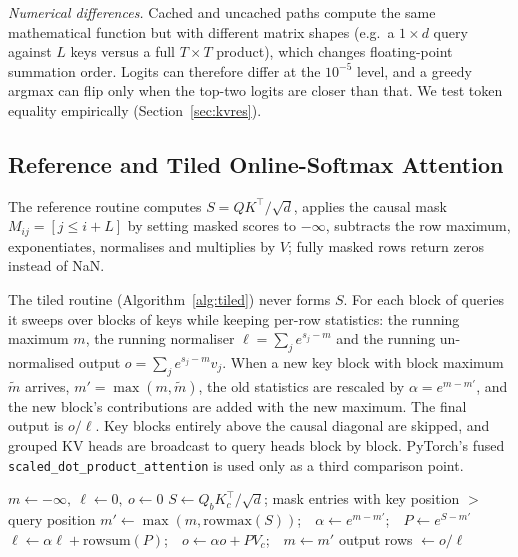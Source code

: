 \emph{Numerical differences.} Cached and uncached paths compute the same mathematical function but with different matrix shapes (e.g.\ a $1\times d$ query against $L$ keys versus a full $T\times T$ product), which changes floating-point summation order. Logits can therefore differ at the $10^{-5}$ level, and a greedy argmax can flip only when the top-two logits are closer than that. We test token equality empirically (Section~\ref{sec:kvres}).

\subsection{Reference and Tiled Online-Softmax Attention}
\label{sec:attn}
The reference routine computes $S=QK^\top/\sqrt d$, applies the causal mask $M_{ij}=[j\le i+L]$ by setting masked scores to $-\infty$, subtracts the row maximum, exponentiates, normalises and multiplies by $V$; fully masked rows return zeros instead of NaN.

The tiled routine (Algorithm~\ref{alg:tiled}) never forms $S$. For each block of queries it sweeps over blocks of keys while keeping per-row statistics: the running maximum $m$, the running normaliser $\ell=\sum_j e^{s_j-m}$ and the running un-normalised output $o=\sum_j e^{s_j-m}v_j$. When a new key block with block maximum $\tilde m$ arrives, $m'=\max(m,\tilde m)$, the old statistics are rescaled by $\alpha=e^{m-m'}$, and the new block's contributions are added with the new maximum. The final output is $o/\ell$. Key blocks entirely above the causal diagonal are skipped, and grouped KV heads are broadcast to query heads block by block. PyTorch's fused \texttt{scaled\_dot\_product\_attention} is used only as a third comparison point.

\begin{algorithm}[t]\caption{Tiled attention with online softmax (one head)}\label{alg:tiled}
\begin{algorithmic}[1]
\small
{}
 \State $m\gets-\infty,\ \ell\gets0,\ o\gets0$
  \State $S\gets Q_bK_c^\top/\sqrt d$; mask entries with key position $>$ query position
  \State $m'\gets\max(m,\mathrm{rowmax}(S))$;\ \ $\alpha\gets e^{m-m'}$;\ \ $P\gets e^{S-m'}$
  \State $\ell\gets\alpha\ell+\mathrm{rowsum}(P)$;\ \ $o\gets\alpha o+PV_c$;\ \ $m\gets m'$
 \EndFor
 \State output rows $\gets o/\ell$
\EndFor
\end{algorithmic}
\end{algorithm}

